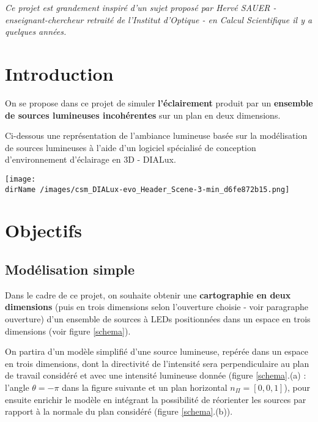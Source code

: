 
\textit{Ce projet est grandement inspiré d'un sujet proposé par \textit{Hervé SAUER} - enseignant-chercheur retraité de l'Institut d'Optique - en Calcul Scientifique il y a quelques années.}

\section{Introduction}

On se propose dans ce projet de simuler \textbf{l'éclairement} produit par un \textbf{ensemble de sources lumineuses incohérentes} sur un plan en deux dimensions.

\medskip

Ci-dessous une représentation de l'ambiance lumineuse basée sur la modélisation de sources lumineuses à l'aide d'un logiciel spécialisé de conception d'environnement d'éclairage en 3D - DIALux.

\begin{center}
	\texttt{[image:  \\dirName /images/csm\_DIALux-evo\_Header\_Scene-3-min\_d6fe872b15.png]}
\end{center}


\section{Objectifs}

\subsection{Modélisation simple}

Dans le cadre de ce projet, on souhaite obtenir une \textbf{cartographie en deux dimensions} (puis en trois dimensions selon l'ouverture choisie - voir paragraphe ouverture) d'un ensemble de sources à LEDs positionnées dans un espace en trois dimensions (voir figure \ref{schema}).

On partira d'un modèle simplifié d'une source lumineuse, repérée dans un espace en trois dimensions, dont la directivité de l'intensité sera perpendiculaire au plan de travail considéré et avec une intensité lumineuse donnée (figure \ref{schema}.(a) : l'angle $\theta = -\pi$ dans la figure suivante et un plan horizontal $n_\Pi = [0, 0, 1]$), pour ensuite enrichir le modèle en intégrant la possibilité de réorienter les sources par rapport à la normale du plan considéré (figure \ref{schema}.(b)).

